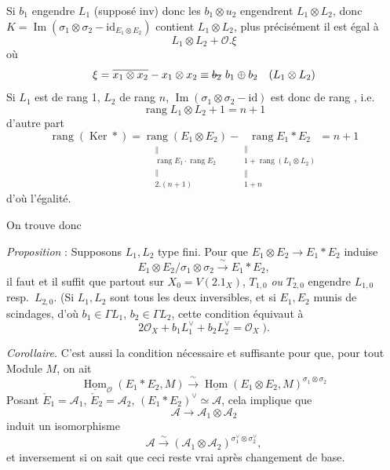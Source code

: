 \documentclass[11pt,a4paper]{article}
\begin{document}
Si $b_1$ \struck{\ill{}} engendre $L_1$ (supposé inv) donc les $b_1 \otimes u_2$ engendrent $L_1 \otimes L_2$, donc \struck{\ill{}} $K = \operatorname{Im}(\sigma_1 \otimes \sigma_2 - \mathrm{id}_{E_1 \otimes E_2})$ contient $L_1 \otimes L_2$, plus précisément il est égal à
\[
  L_1 \otimes L_2 + \mathcal{O} . \xi
\]
où
\[
  \xi = \overline{x_1 \otimes x_2} - x_1 \otimes x_2 \equiv \text{\struck{$b_2$}}\ b_1 \oplus b_2 \quad (L_1 \otimes L_2)
\]
Si $L_1$ est de rang 1, $L_2$ de rang $n$, $\operatorname{Im}(\sigma_1 \otimes \sigma_2 - \mathrm{id})$ est donc de rang , i.e.
\[
  \operatorname{rang} L_1 \otimes L_2 + 1 = n + 1
\]
d'autre part
\[
  \operatorname{rang}(\operatorname{Ker} *) =
  \underset{\substack{\| \\ \operatorname{rang} E_1 \cdot \operatorname{rang} E_2 \\ \| \\ 2 . (n+1)}}{\operatorname{rang}(E_1 \otimes E_2)}
  - \underset{\substack{\| \\ 1 + \operatorname{rang}(L_1 \otimes L_2) \\ \| \\ 1 + n}}{\operatorname{rang} E_1 * E_2}
  = n + 1
\]
d'où l'égalité.

On trouve donc

\emph{Proposition} : Supposons \struck{\ill{}} $L_1, L_2$   type fini. Pour que $E_1 \otimes E_2 \to E_1 * E_2$ induise
\[
  E_1 \otimes E_2 / \sigma_1 \otimes \sigma_2 \xrightarrow{\ \sim\ } E_1 * E_2 ,
\]
il faut et il suffit que \struck{\ill{}} \struck{\ill{}} partout sur $X_0 = V(2.1_X)$, $T_{1,0}$ \emph{ou} $T_{2,0}$ engendre $L_{1,0}$ resp.\ $L_{2,0}$. (Si $L_1, L_2$ sont tous les deux inversibles, et si $E_1, E_2$ munis de scindages, d'où $b_1 \in \Gamma L_1$, $b_2 \in \Gamma L_2$, cette condition équivaut à
\[
  2 \mathcal{O}_X + b_1 L_1^{\vee} + b_2 L_2^{\vee} = \mathcal{O}_X \;) .
\]

\emph{Corollaire.} C'est aussi la condition nécessaire et suffisante pour que, pour tout Module $M$, on ait
\[
  \underline{\operatorname{Hom}}_{\mathcal{O}}(E_1 * E_2, M) \xrightarrow{\ \sim\ } \underline{\operatorname{Hom}}(E_1 \otimes E_2, M)^{\sigma_1 \otimes \sigma_2}
\]
Posant $\check{E}_1 = \mathcal{A}_1$, $\check{E}_2 = \mathcal{A}_2$, $(E_1 * E_2)^{\vee} \simeq \mathcal{A}$, cela implique que
\[
  \mathcal{A} \longrightarrow \mathcal{A}_1 \otimes \mathcal{A}_2
\]
induit un isomorphisme
\[
  \mathcal{A} \xrightarrow{\ \sim\ } (\mathcal{A}_1 \otimes \mathcal{A}_2)^{\sigma_1^{\vee} \otimes \sigma_2^{\vee}} ,
\]
et inversement si on sait que ceci \struck{\ill{}} reste vrai après  changement de base.
\end{document}
